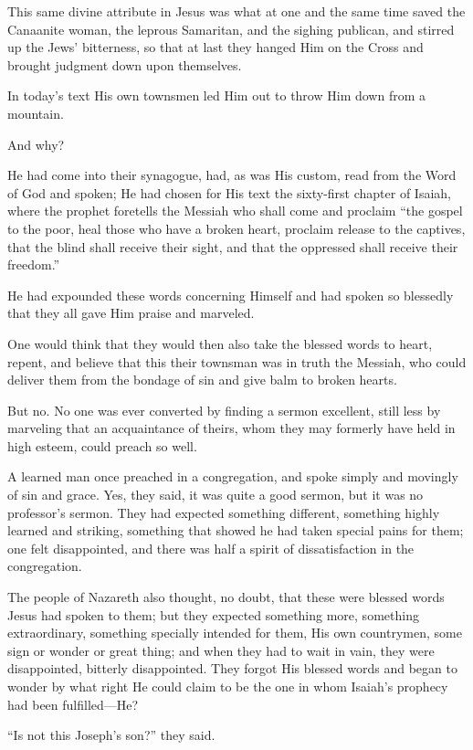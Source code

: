 This same divine attribute in Jesus was what at one and the same time saved the Canaanite woman, the leprous Samaritan, and the sighing publican, and stirred up the Jews’ bitterness, so that at last they hanged Him on the Cross and brought judgment down upon themselves.

In today’s text His own townsmen led Him out to throw Him down from a mountain.

And why?

He had come into their synagogue, had, as was His custom, read from the Word of God and spoken; He had chosen for His text the sixty-first chapter of Isaiah, where the prophet foretells the Messiah who shall come and proclaim “the gospel to the poor, heal those who have a broken heart, proclaim release to the captives, that the blind shall receive their sight, and that the oppressed shall receive their freedom.”

He had expounded these words concerning Himself and had spoken so blessedly that they all gave Him praise and marveled.

One would think that they would then also take the blessed words to heart, repent, and believe that this their townsman was in truth the Messiah, who could deliver them from the bondage of sin and give balm to broken hearts.

But no. No one was ever converted by finding a sermon excellent, still less by marveling that an acquaintance of theirs, whom they may formerly have held in high esteem, could preach so well.

A learned man once preached in a congregation, and spoke simply and movingly of sin and grace. Yes, they said, it was quite a good sermon, but it was no professor’s sermon. They had expected something different, something highly learned and striking, something that showed he had taken special pains for them; one felt disappointed, and there was half a spirit of dissatisfaction in the congregation.

The people of Nazareth also thought, no doubt, that these were blessed words Jesus had spoken to them; but they expected something more, something extraordinary, something specially intended for them, His own countrymen, some sign or wonder or great thing; and when they had to wait in vain, they were disappointed, bitterly disappointed. They forgot His blessed words and began to wonder by what right He could claim to be the one in whom Isaiah’s prophecy had been fulfilled—He?

“Is not this Joseph’s son?” they said.

